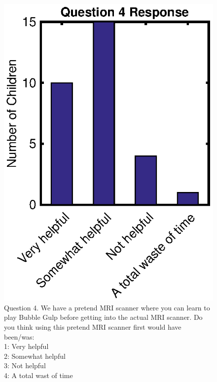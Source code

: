 	\begin{figure}
		\centering
		\includegraphics{figures/gamepaper/Question4}
		\caption[Survey Question 4]{Question 4.	We have a pretend MRI scanner where you can learn to play Bubble Gulp before getting into the actual MRI scanner. Do you think using this pretend MRI scanner first would have been/was: \\ 1: Very helpful \\ 2: Somewhat helpful \\3: Not helpful \\ 4: A total wast of time}
		\label{fig:question4}
	\end{figure}
	
